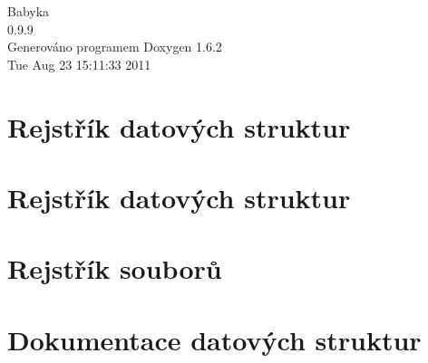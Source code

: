 \documentclass[a4paper]{book}
\begin{document}
\begin{titlepage}
\vspace*{7cm}
\begin{center}
{\Large Babyka \\[1ex]\large 0.9.9 }\\
\vspace*{1cm}
{\large Generováno programem Doxygen 1.6.2}\\
\vspace*{0.5cm}
{\small Tue Aug 23 15:11:33 2011}\\
\end{center}
\end{titlepage}
\clearemptydoublepage
{}
\tableofcontents
\clearemptydoublepage
{}
\chapter{Rejstřík datových struktur}

\chapter{Rejstřík datových struktur}

\chapter{Rejstřík souborů}

\chapter{Dokumentace datových struktur}























\end{document}
